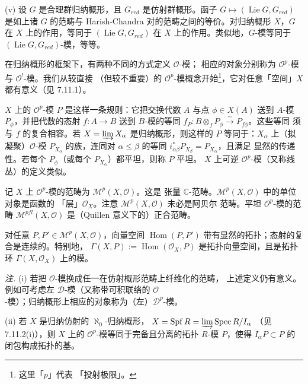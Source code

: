 (v) 设 $G$ 是合理群归纳概形，且 $G_{red}$ 是仿射群概形。函子
$G\mapsto(\operatorname{Lie}G,G_{red})$ 是如上诸 $G$ 的范畴与 Harish-Chandra
对的范畴之间的等价。对归纳概形 $X$，$G$ 在 $X$ 上的作用，等同于
$(\operatorname{Lie}G,G_{red})$ 在 $X$ 上的作用。类似地，$G$-模等同于
$(\operatorname{Lie}G,G_{red})$-模，等等。

 在归纳概形的框架下，有两种不同的方式定义 $\mathcal{O}$-模；
相应的对象分别称为 $\mathcal{O}^{p}$-模与 $\mathcal{O}^{!}$-模。我们从较直接
（但较不重要）的 $\mathcal{O}^{p}$-模概念开始\footnote{这里「$p$」代表
「投射极限」。}，它对任意「空间」$X$ 都有意义（见 7.11.1）。

$X$ 上的 $\mathcal{O}^{p}$-模 $P$ 是这样一条规则：它把交换代数 $A$ 与点
$\phi\in X(A)$ 送到 $A$-模 $P_\phi$，并把代数的态射 $f:A\to B$ 送到
$B$-模的等同 $f_P:B\otimes_f P_\phi\xrightarrow{\ \sim\ }P_{f\phi}$。这些等同
须与 $f$ 的复合相容。若 $X=\varinjlim X_\alpha$ 是归纳概形，则这样的 $P$
等同于：$X_\alpha$ 上（拟凝聚）$\mathcal{O}$-模 $P_{X_\alpha}$ 的族，连同对
$\alpha\le\beta$ 的等同 $i^*_{\alpha\beta}P_{X_\beta}=P_{X_\alpha}$，且满足
显然的传递性。若每个 $P_\phi$（或每个 $P_{X_\alpha}$）都平坦，则称 $P$ 平坦。
$X$ 上可逆 $\mathcal{O}^{p}$-模（又称线丛）的定义类似。


记 $X$ 上 $\mathcal{O}^{p}$-模的范畴为 $\mathcal{M}^{p}(X,\mathcal{O})$。这是
张量 $\mathbb{C}$-范畴。$\mathcal{M}^{p}(X,\mathcal{O})$ 中的单位对象是函数的
「层」$\mathcal{O}_X$。注意 $\mathcal{M}^{p}(X,\mathcal{O})$ 未必是阿贝尔
范畴。平坦 $\mathcal{O}^{p}$-模的范畴
$\mathcal{M}^{pfl}(X,\mathcal{O})$ 是（Quillen 意义下的）正合范畴。

对任意 $P,P'\in\mathcal{M}^{p}(X,\mathcal{O})$，向量空间
$\operatorname{Hom}(P,P')$ 带有显然的拓扑；态射的复合是连续的。特别地，
$\Gamma(X,P):=\operatorname{Hom}(\mathcal{O}_X,P)$ 是拓扑向量空间，且是拓扑环
$\Gamma(X,\mathcal{O}_X)$ 上的模。

\emph{注.} (i) 若把 $\mathcal{O}$-模换成任一在仿射概形范畴上纤维化的范畴，
上述定义仍有意义。例如可考虑左 $\mathcal{D}$-模（又称带可积联络的
$\mathcal{O}$-模）；归纳概形上相应的对象称为（左）$\mathcal{D}^{p}$-模。

(ii) 若 $X$ 是归纳仿射的 $\aleph_0$-归纳概形，
$X=\operatorname{Spf}R=\varinjlim\operatorname{Spec}R/I_\alpha$
（见 7.11.2(i)），则 $X$ 上的 $\mathcal{O}^{p}$-模等同于完备且分离的拓扑
$R$-模 $P$，使得 $I_\alpha P\subset P$ 的闭包构成拓扑的基。

